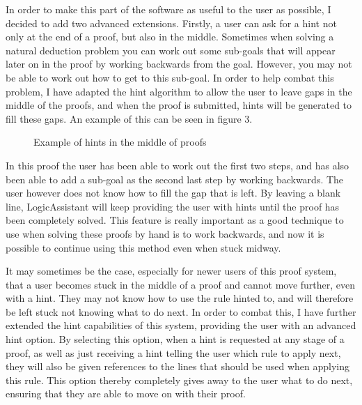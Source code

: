 In order to make this part of the software as useful to the user as possible, I decided to add two advanced extensions. Firstly, a user can ask for a hint not only at the end of a proof, but also in the middle. Sometimes when solving a natural deduction problem you can work out some sub-goals that will appear later on in the proof by working backwards from the goal. However, you may not be able to work out how to get to this sub-goal. In order to help combat this problem, I have adapted the hint algorithm to allow the user to leave gaps in the middle of the proofs, and when the proof is submitted, hints will be generated to fill these gaps. An example of this can be seen in figure 3.

\begin{figure}[!ht]
	\centering
	\caption{Example of hints in the middle of proofs}
\end{figure}

In this proof the user has been able to work out the first two steps, and has also been able to add a sub-goal as the second last step by working backwards. The user however does not know how to fill the gap that is left. By leaving a blank line, LogicAssistant will keep providing the user with hints until the proof has been completely solved. This feature is really important as a good technique to use when solving these proofs by hand is to work backwards, and now it is possible to continue using this method even when stuck midway. 

It may sometimes be the case, especially for newer users of this proof system, that a user becomes stuck in the middle of a proof and cannot move further, even with a hint. They may not know how to use the rule hinted to, and will therefore be left stuck not knowing what to do next. In order to combat this, I have further extended the hint capabilities of this system, providing the user with an advanced hint option. By selecting this option, when a hint is requested at any stage of a proof, as well as just receiving a hint telling the user which rule to apply next, they will also be given references to the lines that should be used when applying this rule. This option thereby completely gives away to the user what to do next, ensuring that they are able to move on with their proof.

